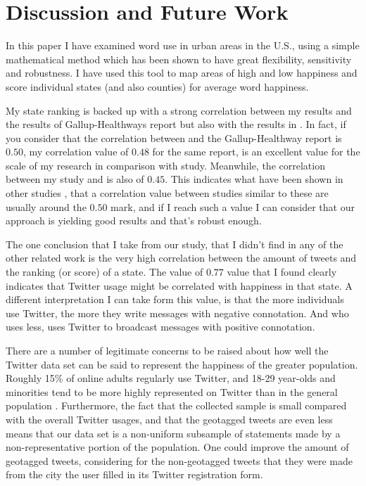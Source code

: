 \documentclass{llncs}
\begin{document}
\FloatBarrier
\section{Discussion and Future Work}
\label{sec:conc}

In this paper I have examined word use in urban areas in the U.S., using a simple mathematical method which has been shown to have great flexibility, sensitivity and robustness. I have used this tool to map areas of high and low happiness and score individual states (and also counties) for average word happiness.

My state ranking is backed up with a strong correlation between my results and the results of Gallup-Healthways report but also with the results in \cite{Mitchell2013}. In fact, if you consider that the correlation between \cite{Mitchell2013} and the Gallup-Healthway report is $0.50$, my correlation value of $0.48$ for the same report, is an excellent value for the scale of my research in comparison with \cite{Mitchell2013} study. Meanwhile, the correlation between my study and \cite{Mitchell2013} is also of $0.45$. This indicates what have been shown in other studies \cite{Dodds2011}, that a correlation value between studies similar to these are usually around the $0.50$ mark, and if I reach such a value I can consider that our approach is yielding good results and that's robust enough.

The one conclusion that I take from our study, that I didn't find in any of the other related work is the very high correlation between the amount of tweets and the ranking (or score) of a state. The value of $0.77$ value that I found clearly indicates that Twitter usage might be correlated with happiness in that state. A different interpretation I can take form this value, is that the more individuals use Twitter, the more they write messages with negative connotation. And who uses less, uses Twitter to broadcast messages with positive connotation.

There are a number of legitimate concerns to be raised about how well the Twitter data set can be said to represent the happiness of the greater population. Roughly 15\% of online adults regularly use Twitter, and 18-29 year-olds and minorities tend to be more highly represented on Twitter than in the general population \cite{Smith2012}. Furthermore, the fact that the collected sample is small compared with the overall Twitter usages, and that the geotagged tweets are even less means that our data set is a non-uniform subsample of statements made by a non-representative portion of the population. One could improve the amount of geotagged tweets, considering for the non-geotagged tweets that they were made from the city the user filled in its Twitter registration form.
\end{document}
